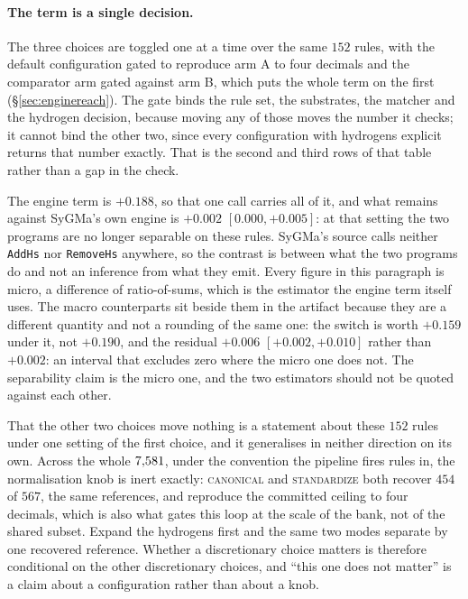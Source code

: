 \paragraph{The term is a single decision.} The three choices are toggled one at a time over the same
$152$ rules, with the default configuration gated to reproduce arm A to four decimals and the
comparator arm gated against arm B, which puts the whole term on the first
(\S\ref{sec:enginereach}). The gate binds the rule set, the substrates, the matcher and the hydrogen
decision, because moving any of those moves the number it checks; it cannot bind the other two,
since every configuration with hydrogens explicit returns that number exactly. That is the second
and third rows of that table rather than a gap in the check.

The engine term is $+0.188$, so that one call carries all of it, and what remains against SyGMa's own
engine is $+0.002$ $[0.000,+0.005]$: at that setting the two programs are no longer separable on
these rules. SyGMa's source calls neither \texttt{AddHs} nor \texttt{RemoveHs} anywhere, so the
contrast is between what the two programs do and not an inference from what they emit. Every figure
in this paragraph is micro, a difference of ratio-of-sums, which is the estimator the engine term
itself uses. The macro counterparts sit beside them in the artifact because they are a different
quantity and not a rounding of the same one: the switch is worth $+0.159$ under it, not $+0.190$, and the residual $+0.006$ $[+0.002,+0.010]$ rather than $+0.002$: an interval that
excludes zero where the micro one does not. The separability claim is the micro one, and the two estimators should not
be quoted against each other.

That the other two choices move nothing is a statement about these $152$ rules under one setting of
the first choice, and it generalises in neither direction on its own. Across the whole $7{,}581$,
under the convention the pipeline fires rules in, the normalisation knob is inert exactly:
\textsc{canonical} and \textsc{standardize} both recover $454$ of $567$, the same references, and
reproduce the committed ceiling to four decimals, which is also what gates this loop at the
scale of the bank, not of the shared subset. Expand the hydrogens first and the same two
modes separate by one recovered reference. Whether a discretionary choice matters is therefore
conditional on the other discretionary choices, and ``this one does not matter'' is a claim about a
configuration rather than about a knob.

